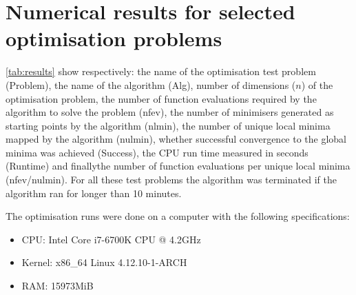 \appendix
\section{Numerical results for selected optimisation problems} \label{sec:nres}
\autoref{tab:results} show respectively: the name of the optimisation test problem (Problem), the name of the algorithm (Alg), number of dimensions ($n$) of the optimisation problem, the number of function evaluations required by the algorithm to solve the problem (nfev), the number of minimisers generated as starting points by the algorithm (nlmin), the number of unique local minima mapped by the algorithm (nulmin), whether successful convergence to the global minima was achieved (Success), the CPU run time measured in seconds (Runtime) and finallythe number of function evaluations per unique local minima (nfev/nulmin). For all these test problems the algorithm was terminated if the algorithm ran for longer than 10 minutes.

The optimisation runs were done on a computer with the following specifications:
\begin{itemize}
\item CPU: Intel Core i7-6700K CPU @ 4.2GHz
\item Kernel: x86\_64 Linux 4.12.10-1-ARCH
\item RAM: 15973MiB
\end{itemize}



